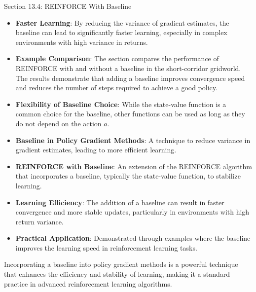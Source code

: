 \begin{notes}{Section 13.4: REINFORCE With Baseline}
\begin{highlight}
        \begin{itemize}
            \item \textbf{Faster Learning}: By reducing the variance of gradient estimates, the baseline can lead to significantly faster learning, especially in complex environments with high variance in returns.
            \item \textbf{Example Comparison}: The section compares the performance of REINFORCE with and without a baseline in the short-corridor gridworld. The results demonstrate that adding a baseline 
            improves convergence speed and reduces the number of steps required to achieve a good policy.
            \item \textbf{Flexibility of Baseline Choice}: While the state-value function is a common choice for the baseline, other functions can be used as long as they do not depend on the action $a$.
        \end{itemize}
    
    \end{highlight}
    
    \begin{highlight}
    
        \begin{itemize}
            \item \textbf{Baseline in Policy Gradient Methods}: A technique to reduce variance in gradient estimates, leading to more efficient learning.
            \item \textbf{REINFORCE with Baseline}: An extension of the REINFORCE algorithm that incorporates a baseline, typically the state-value function, to stabilize learning.
            \item \textbf{Learning Efficiency}: The addition of a baseline can result in faster convergence and more stable updates, particularly in environments with high return variance.
            \item \textbf{Practical Application}: Demonstrated through examples where the baseline improves the learning speed in reinforcement learning tasks.
        \end{itemize}
    
        Incorporating a baseline into policy gradient methods is a powerful technique that enhances the efficiency and stability of learning, making it a standard practice in advanced reinforcement learning algorithms.
    \end{highlight}
\end{notes}